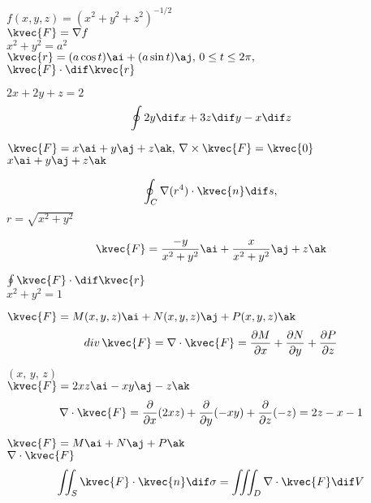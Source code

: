 \( f( x,y,z)= (x^2 + y^2 + z^2 )^{-1/2} \) \\
\( \kvec{F} = \nabla f \) \\
\( x^2 +y^2 = a^2 \) \\
\( \kvec{r} = (a \cos t ) \ai + ( a \sin t ) \aj , \, 0 \le t \le 2 \pi , \, \) \\
\( \kvec{F} \cdot \dif \kvec{r} \) 

\( 2x + 2y + z = 2 \) \\
\begin{align*}
\oint 2y \dif x + 3z \dif y -x \dif z
\end{align*}

\( \kvec{F} = x\ai +y\aj +z\ak , \, \nabla \times \kvec{F} = \kvec{0} \) \\

\( x\ai + y\aj + z\ak \) 

\begin{align*}
\oint _C \nabla (r^4) \cdot \kvec{n} \dif s, 
\end{align*}
\( r= \sqrt{x^2 + y^2 } \)

\begin{align*}
\kvec{F} = \frac{-y}{x^2 + y^2} \ai + \frac{x}{x^2 + y^2 } \aj + z\ak
\end{align*}

\( \oint \kvec{F} \cdot \dif \kvec{r} \) \\
\( x^2 + y^2 =1 \)


\( \kvec{F}=M(x,y,z) \ai + N(x,y,z) \aj + P(x,y,z) \ak \)\\

\begin{align}
div\, \kvec{F}=\nabla \cdot \kvec{F} = \frac{\partial M}{\partial x} + \frac{\partial N}{\partial y}+ \frac{\partial P}{\partial z}
\end{align}


\( (x, \, y, \, z) \) \\


\( \kvec{F} = 2xz \ai -xy \aj -z \ak \) \\
\begin{align*}
\nabla \cdot \kvec{F} = \frac{\partial}{\partial x} (2xz) + \frac{\partial}{\partial y} ( -xy) + \frac{\partial}{\partial z} (-z) = 2z-x-1
\end{align*}

\( \kvec{F} = M\ai + N\aj + P\ak \) \\
\( \nabla \cdot \kvec{F} \) \\
\begin{align}
\iint_S \kvec{F} \cdot \kvec{n} \dif \sigma = \iiint_D \nabla \cdot \kvec{F} \dif V
\end{align}


